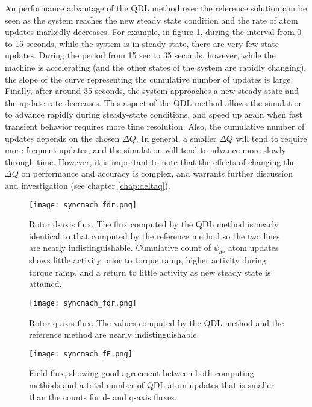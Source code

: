 An performance advantage of the QDL method over the reference solution can be seen as the system reaches the new steady state condition and the rate of atom updates markedly decreases. For example, in figure \ref{fig:syncmach_fdr}, during the interval from 0 to 15 seconds, while the system is in steady-state, there are very few state updates. During the period from 15 sec to 35 seconds, however, while the machine is accelerating (and the other states of the system are rapidly changing), the slope of the curve representing the cumulative number of updates is large. Finally, after around 35 seconds, the system approaches a new steady-state and the update rate decreases. This aspect of the QDL method allows the simulation to advance rapidly during steady-state conditions, and speed up again when fast transient behavior requires more time resolution. Also, the cumulative number of updates depends on the chosen $\Delta Q$. In general, a smaller $\Delta Q$ will tend to require more frequent updates, and the simulation will tend to advance more slowly through time. However, it is important to note that the effects of changing the $\Delta Q$ on performance and accuracy is complex, and warrants further discussion and investigation (see chapter \ref{chap:deltaq}).

\begin{figure}[h]
    \centering
    \texttt{[image: syncmach\_fdr.png]}
    \caption{Rotor d-axis flux. The flux computed by the QDL method is nearly identical to that computed by the reference method so the two lines are nearly indistinguishable. Cumulative count of $\psi_{dr}$ atom updates shows little activity prior to torque ramp, higher activity during torque ramp, and a return to little activity as new steady state is attained.}
    \label{fig:syncmach_fdr}
\end{figure}

\begin{figure}[h]
    \centering
    \texttt{[image: syncmach\_fqr.png]}
    \caption{Rotor q-axis flux. The values computed by the QDL method and the reference method are nearly indistinguishable.}
    \label{fig:syncmach_fqr}
\end{figure}

\begin{figure}[h]
    \centering
    \texttt{[image: syncmach\_fF.png]}
    \caption{Field flux, showing good agreement between both computing methods and a total number of QDL atom updates that is smaller than the counts for d- and q-axis fluxes.}
    \label{fig:syncmach_fF}
\end{figure}

